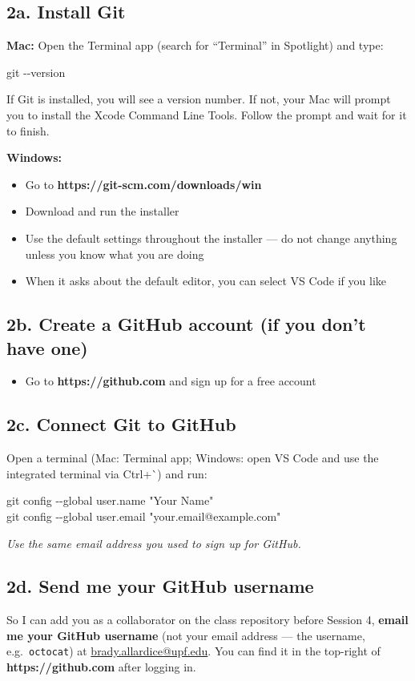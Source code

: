 \documentclass[11pt]{article}
\newcommand{\cmd}[1]{\par\vspace{0.2em}\colorbox{codegray}{\parbox{\dimexpr\linewidth-2\fboxsep}{\ttfamily\small #1}}\par\vspace{0.2em}}
\newcommand{\plat}[1]{{\color{headingblue}\textbf{#1}}}
\begin{document}
\subsection*{2a. Install Git}

\plat{Mac:} Open the Terminal app (search for ``Terminal'' in Spotlight) and type:
\cmd{git -\/-version}
If Git is installed, you will see a version number. If not, your Mac will prompt you to install the Xcode Command Line Tools. Follow the prompt and wait for it to finish.

\plat{Windows:}
\begin{itemize}[leftmargin=2em,itemsep=0pt]
  \item Go to \textbf{https://git-scm.com/downloads/win}
  \item Download and run the installer
  \item Use the default settings throughout the installer --- do not change anything unless you know what you are doing
  \item When it asks about the default editor, you can select VS Code if you like
\end{itemize}

\subsection*{2b. Create a GitHub account (if you don't have one)}
\begin{itemize}[leftmargin=2em,itemsep=0pt]
  \item Go to \textbf{https://github.com} and sign up for a free account
\end{itemize}

\subsection*{2c. Connect Git to GitHub}
Open a terminal (Mac: Terminal app; Windows: open VS Code and use the integrated terminal via Ctrl+\`{}) and run:
\cmd{git config -\/-global user.name "Your Name"\\git config -\/-global user.email "your.email@example.com"}
\textit{Use the same email address you used to sign up for GitHub.}

\subsection*{2d. Send me your GitHub username}
So I can add you as a collaborator on the class repository before Session 4, \textbf{email me your GitHub username} (not your email address --- the username, e.g.\ \texttt{octocat}) at \href{mailto:brady.allardice@upf.edu}{brady.allardice@upf.edu}. You can find it in the top-right of \textbf{https://github.com} after logging in.
\end{document}
